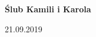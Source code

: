 \documentclass[10pt, a5paper]{extarticle}
\begin{document}
\begin{titlepage}
\begin{center}
\vspace{4.0cm}
\huge
\textbf{Ślub Kamili i Karola}
\vspace{1.5cm}

{\large 21.09.2019}
\end{center}
\end{titlepage}




\end{document}
